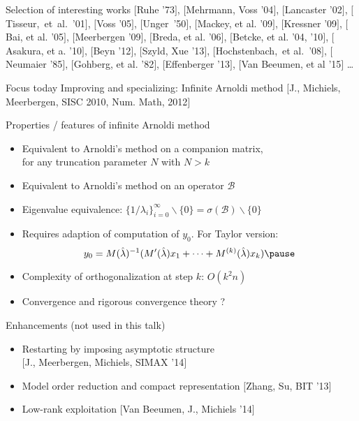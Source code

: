 \documentclass[10pt]{beamer}
\newcommand{\mycite}[1]{$[$#1$]$}
\begin{document}
\begin{frame}
\begin{block}{Selection of interesting works}
\small  \mycite{Ruhe '73}, \mycite{Mehrmann, Voss '04},
\mycite{Lancaster '02}, 
\mycite{Tisseur,~et~al.~'01}, \mycite{Voss '05}, \mycite{Unger~'50}, \mycite{Mackey, et al. '09}, 
\mycite{Kressner '09}, 
\mycite{Bai, et al. '05}, \mycite{Meerbergen '09}, \mycite{Breda, et al. '06},
\mycite{Betcke, et al. '04, '10}, 
\mycite{Asakura, et a. '10}, 
\mycite{Beyn '12}, \mycite{Szyld, Xue '13},
\mycite{Hochstenbach,~et al.~'08}, \mycite{Neumaier '85},
\mycite{Gohberg, et al. '82}, \mycite{Effenberger '13},
\mycite{Van Beeumen, et al '15}
\ldots
\end{block}\pause
\begin{block}{Focus today}
Improving and specializing: Infinite Arnoldi method 
{\small\mycite{J., Michiels, Meerbergen, SISC 2010, 
Num. Math, 2012}}
\end{block}
\end{frame}
\begin{frame}
\begin{block}{Properties / features of infinite Arnoldi method}
\begin{itemize}
  \item Equivalent to Arnoldi's method on a companion matrix, \\ for any truncation parameter $N$ with $N>k$\pause
  \item Equivalent to Arnoldi's method on an operator $\mathcal{B}$
  \item Eigenvalue equivalence: $\{1/\lambda_i \}_{i=0}^\infty\backslash\{0\}=\sigma(\mathcal{B})\backslash\{0\}$\pause
  \item Requires adaption of computation of $y_0$. For Taylor version: 
\[
y_0=M(\hat{\lambda})^{-1}(M'(\hat{\lambda})x_1+\cdots+M^{(k)}(\hat{\lambda})x_k)\pause
\]\vspace{-0.6cm}
  \item Complexity of orthogonalization at step $k$: $O(k^2n)$
  \item Convergence and rigorous convergence theory ? 
\end{itemize}
\end{block}\pause
\begin{block}{Enhancements (not used in this talk)}
\begin{itemize}
  \item Restarting by imposing asymptotic structure \\\mycite{J., Meerbergen, Michiels, SIMAX '14}
  \item Model order reduction and compact representation \mycite{Zhang, Su, BIT  '13}
  \item Low-rank exploitation  \mycite{Van Beeumen, J., Michiels '14}
\end{itemize}
\end{block}
\end{frame}
\end{document}
